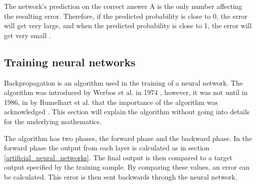 The network's prediction on the correct answer A is the only number affecting the resulting error. Therefore, if the predicted probability is close to 0, the error will get very large, and when the predicted probability is close to 1, the error will get very small \cite{brownlee_how_2017}.

\subsection{Training neural networks}
\label{training_with_backpropagation}

Backpropagation is an algorithm used in the training of a neural network. The algorithm was introduced by Werbos et al. in 1974 \cite{werbos_beyond_1974}, however, it was not until in 1986, in \cite{rumelhart_learning_1986} by Rumelhart et al. that the importance of the algorithm was acknowledged \cite{_backpropagation_????-1}. This section will explain the algorithm without going into details for the underlying mathematics. 

The algorithm has two phases, the forward phase and the backward phase. In the forward phase the output from each layer is calculated as in section \ref{artificial_neural_networks}. The final output is then compared to a target output specified by the training sample. By comparing these values, an error can be calculated. This error is then sent backwards through the neural network.

